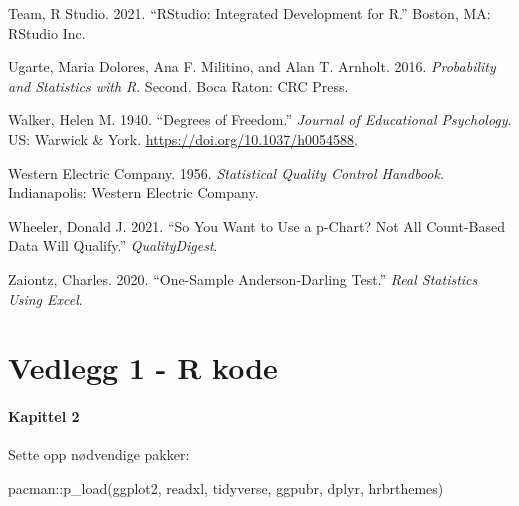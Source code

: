 \documentclass[
]{book}
\newenvironment{Shaded}{\begin{snugshade}}{\end{snugshade}}
\newcommand{\FunctionTok}[1]{\textcolor[rgb]{0.00,0.00,0.00}{#1}}
\newcommand{\NormalTok}[1]{#1}
\newcommand{\SpecialCharTok}[1]{\textcolor[rgb]{0.00,0.00,0.00}{#1}}
\newlength{\cslhangindent}
\newenvironment{CSLReferences}[2] %
 {%
  \setlength{\parindent}{0pt}
  \ifodd #1 \everypar{\setlength{\hangindent}{\cslhangindent}}\ignorespaces\fi
  \ifnum #2 > 0
  \setlength{\parskip}{#2\baselineskip}
  \fi
 }%
 {}
\begin{document}
\begin{CSLReferences}{1}{0}
\leavevmode{}%
Team, R Studio. 2021. {``{RStudio}: Integrated {Development} for {R}.''} {Boston, MA}: RStudio Inc.

\leavevmode{}%
Ugarte, Maria Dolores, Ana F. Militino, and Alan T. Arnholt. 2016. \emph{Probability and {Statistics} with {R}}. Second. {Boca Raton}: {CRC Press}.

\leavevmode{}%
Walker, Helen M. 1940. {``Degrees of Freedom.''} \emph{Journal of Educational Psychology}. {US}: {Warwick \& York}. \url{https://doi.org/10.1037/h0054588}.

\leavevmode{}%
Western Electric Company. 1956. \emph{Statistical Quality Control Handbook}. {Indianapolis}: {Western Electric Company}.

\leavevmode{}%
Wheeler, Donald J. 2021. {``So You Want to Use a p-{Chart}? Not All Count-Based Data Will Qualify.''} \emph{QualityDigest}.

\leavevmode{}%
Zaiontz, Charles. 2020. {``One-Sample Anderson-Darling Test.''} \emph{Real Statistics Using Excel}.

\end{CSLReferences}

\hypertarget{vedlegg-1---r-kode}{%
\chapter*{Vedlegg 1 - R kode}\label{vedlegg-1---r-kode}}

\hypertarget{kapittel-2}{%
\subsubsection*{Kapittel 2}\label{kapittel-2}}

Sette opp nødvendige pakker:

\begin{Shaded}
\begin{Highlighting}[]
\NormalTok{pacman}\SpecialCharTok{::}\FunctionTok{p\_load}\NormalTok{(ggplot2, readxl, tidyverse, ggpubr, dplyr, hrbrthemes)}
\end{Highlighting}
\end{Shaded}
\end{document}
